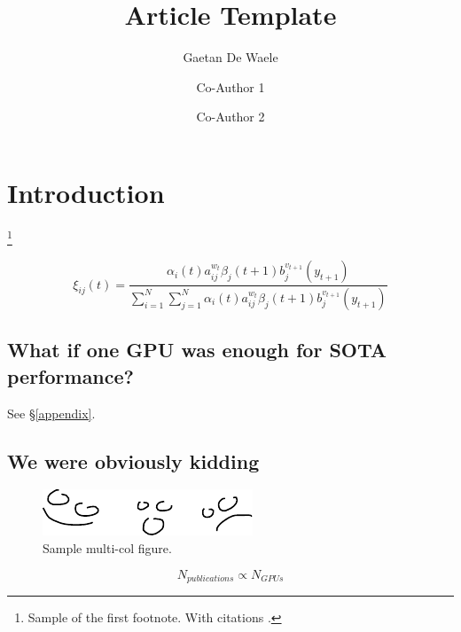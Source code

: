 \documentclass[twocolumn]{article}
\title{Article Template}
\author[1, *]{Gaetan De Waele}
\author[1]{Co-Author 1}
\author[2]{Co-Author 2}
\affil[1]{Ghent University}
\affil[2]{Institute of X}
\affil[*]{Correspondence to <mail@address.com>.}
\begin{document}
\section{Introduction}
\lipsum[1]\footnote{Sample of the first footnote. With citations \citep{devlin2018bert}.}

\begin{equation}
	\xi _{ij}(t)= {\frac {\alpha _{i}(t)a^{w_t}_{ij}\beta _{j}(t+1)b^{v_{t+1}}_{j}(y_{t+1})}{\sum _{i=1}^{N} \sum _{j=1}^{N} \alpha _{i}(t)a^{w_t}_{ij}\beta _{j}(t+1)b^{v_{t+1}}_{j}(y_{t+1})}}
\end{equation}

\lipsum[2]

\subsection{What if one GPU was enough for SOTA performance?} \label{sec:onegpu}
\lipsum[3] See \S \ref{appendix}.

\subsection{We were obviously kidding}
\lipsum[4]

\begin{figure}[t!]
	\centering
	\includegraphics[width=0.50\linewidth]{emotion}
	\caption{Sample multi-col figure.}
	\label{fig:fig2}
\end{figure}

\begin{equation}
	N_{publications} \propto N_{GPUs}
\end{equation}

\lipsum[5]
\end{document}
